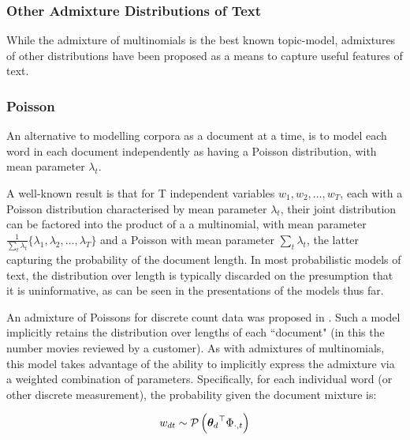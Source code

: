 

\subsubsection{Other Admixture Distributions of Text}

While the admixture of multinomials is the best known topic-model, admixtures of other distributions have been proposed as a means to capture useful features of text.

%
%

\subsubsection*{Poisson}
An alternative to modelling corpora as a document at a time, is to model each word in each document independently as having a Poisson distribution, with mean parameter $\lambda_t$. 

A well-known result\cite{Bishop2006}\cite{Inouye2014} is that for T independent variables $w_1, w_2, \ldots, w_T$, each with a Poisson distribution characterised by mean parameter $\lambda_t$, their joint distribution can be factored into the product of a a multinomial, with mean parameter $\frac{1}{\sum_t \lambda_t} \{\lambda_1, \lambda_2, \ldots, \lambda_T\}$ and a Poisson with mean parameter $\sum_t \lambda_t$, the latter capturing the probability of the document length. In most probabilistic models of text, the distribution over length is typically discarded on the presumption that it is uninformative, as can be seen in the presentations of the models thus far.

An admixture of Poissons for discrete count data was proposed in \cite{Gopalan2013}. Such a model implicitly retains the distribution over lengths of each ``document" (in this the number movies reviewed by a customer). As with admixtures of multinomials, this model takes advantage of the ability to implicitly express the admixture via a weighted combination of parameters. Specifically, for each individual word (or other discrete measurement), the probability given the document mixture is:


\begin{align}
w_{dt} \sim \mathcal{P} \left( {{ \bm \theta_d }^\top\Phi_{\cdot,t}} \right)
\end{align}

